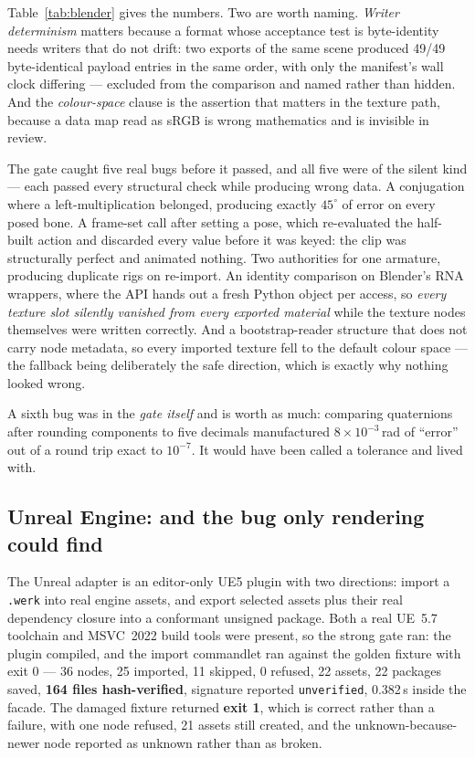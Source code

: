 \documentclass[10pt,twocolumn,letterpaper]{article}
\newcommand{\code}[1]{\texttt{\small #1}}
\begin{document}
Table~\ref{tab:blender} gives the numbers. Two are worth naming. \emph{Writer
determinism} matters because a format whose acceptance test is byte-identity needs
writers that do not drift: two exports of the same scene produced 49/49
byte-identical payload entries in the same order, with only the manifest's wall
clock differing --- excluded from the comparison and named rather than hidden.
And the \emph{colour-space} clause is the assertion that matters in the texture
path, because a data map read as sRGB is wrong mathematics and is invisible in
review.

The gate caught five real bugs before it passed, and all five were of the silent
kind --- each passed every structural check while producing wrong data. A
conjugation where a left-multiplication belonged, producing exactly $45^\circ$ of
error on every posed bone. A frame-set call after setting a pose, which
re-evaluated the half-built action and discarded every value before it was keyed:
the clip was structurally perfect and animated nothing. Two authorities for one
armature, producing duplicate rigs on re-import. An identity comparison on
Blender's RNA wrappers, where the API hands out a fresh Python object per access,
so \emph{every texture slot silently vanished from every exported material} while
the texture nodes themselves were written correctly. And a bootstrap-reader
structure that does not carry node metadata, so every imported texture fell to
the default colour space --- the fallback being deliberately the safe direction,
which is exactly why nothing looked wrong.

A sixth bug was in the \emph{gate itself} and is worth as much: comparing
quaternions after rounding components to five decimals manufactured
$8\times10^{-3}$\,rad of ``error'' out of a round trip exact to $10^{-7}$. It would
have been called a tolerance and lived with.

\subsection{Unreal Engine: and the bug only rendering could find}

The Unreal adapter is an editor-only UE5 plugin with two directions: import a
\code{.werk} into real engine assets, and export selected assets plus their real
dependency closure into a conformant unsigned package. Both a real UE~5.7
toolchain and MSVC~2022 build tools were present, so the strong gate ran: the
plugin compiled, and the import commandlet ran against the golden fixture with
exit 0 --- 36 nodes, 25 imported, 11 skipped, 0 refused, 22 assets, 22 packages
saved, \textbf{164 files hash-verified}, signature reported \code{unverified},
0.382\,s inside the facade. The damaged fixture returned \textbf{exit 1}, which is
correct rather than a failure, with one node refused, 21 assets still created, and
the unknown-because-newer node reported as unknown rather than as broken.
\end{document}
